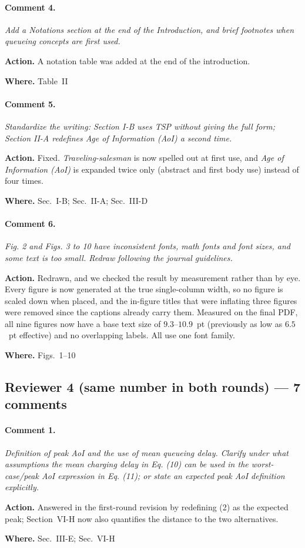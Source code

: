 \documentclass[10pt]{article}
\newcommand{\rev}[1]{\par\medskip\noindent\textit{#1}\par\smallskip}
\newcommand{\act}[2]{\noindent\textbf{Action.} #1\par\noindent\textbf{Where.} #2\par}
\begin{document}
\paragraph{Comment 4.}
\rev{Add a Notations section at the end of the Introduction, and brief footnotes when queueing concepts are first used.}
\act{A notation table was added at the end of the introduction.}{Table~II}

\paragraph{Comment 5.}
\rev{Standardize the writing: Section I-B uses TSP without giving the full form; Section II-A redefines Age of Information (AoI) a second time.}
\act{Fixed. \emph{Traveling-salesman} is now spelled out at first use, and \emph{Age of Information (AoI)} is expanded twice only (abstract and first body use) instead of four times.}{Sec.~I-B; Sec.~II-A; Sec.~III-D}

\paragraph{Comment 6.}
\rev{Fig. 2 and Figs. 3 to 10 have inconsistent fonts, math fonts and font sizes, and some text is too small. Redraw following the journal guidelines.}
\act{Redrawn, and we checked the result by measurement rather than by eye. Every figure is now generated at the true single-column width, so no figure is scaled down when placed, and the in-figure titles that were inflating three figures were removed since the captions already carry them. Measured on the final PDF, all nine figures now have a base text size of $9.3$--$10.9$~pt (previously as low as $6.5$~pt effective) and no overlapping labels. All use one font family.}{Figs.~1--10}

\subsection*{Reviewer 4 (same number in both rounds) --- 7 comments}

\paragraph{Comment 1.}
\rev{Definition of peak AoI and the use of mean queueing delay. Clarify under what assumptions the mean charging delay in Eq. (10) can be used in the worst-case/peak AoI expression in Eq. (11); or state an expected peak AoI definition explicitly.}
\act{Answered in the first-round revision by redefining (2) as the expected peak; Section~VI-H now also quantifies the distance to the two alternatives.}{Sec.~III-E; Sec.~VI-H}
\end{document}
